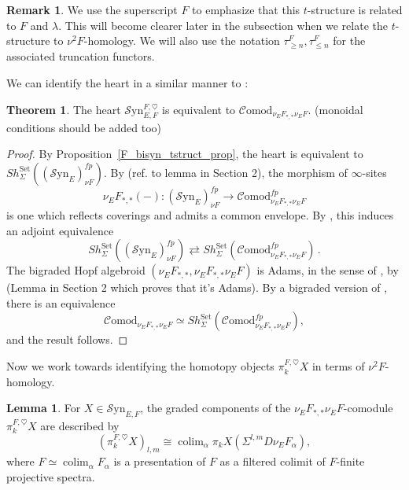 \documentclass[10pt]{amsart}
\theoremstyle{definition}
\numberwithin{figure}{section}
\numberwithin{equation}{section}
\newtheorem{theorem}[figure]{Theorem}
\newtheorem{lemma}[figure]{Lemma}
\newtheorem{remark}[figure]{Remark}
\theoremstyle{cited}
\newcommand{\colim}{\operatorname{colim}}
\newcommand{\Syn}{\mathcal{S}\mathrm{yn}}
\newcommand{\Comod}{\mathcal{C}\mathrm{omod}}
\begin{document}
\begin{remark}
We use the superscript $F$ to emphasize that this $t$-structure is related to $F$ and $\lambda$. This will become clearer later in the subsection when we relate the $t$-structure to $\nu^2F$-homology. We will also use the notation $\tau_{\geq n}^F, \tau_{\leq n}^F$ for the associated truncation functors.
\end{remark}

We can identify the heart in a similar manner to \cite{Pst22}:

\begin{theorem}
    The heart $\Syn_{E,F}^{F,\heartsuit}$ is equivalent to $\Comod_{\nu_EF_{*,*}\nu_EF}$. (monoidal conditions should be added too)
\end{theorem}

\begin{proof}
    By Proposition~\ref{F_bisyn_tstruct_prop}, the heart is equivalent to $Sh_{\Sigma}^{\mathrm{Set}}((\Syn_E)_{\nu F}^{fp})$. By (ref. to lemma in Section 2), the morphism of $\infty$-sites $$\nu_EF_{*,*}(-):(\Syn_E)_{\nu F}^{fp}\to\Comod_{\nu_EF_{*,*}\nu_EF}^{fp}$$ is one which reflects coverings and admits a common envelope. By \cite[Rem. 2.50]{Pst22}, this induces an adjoint equivalence $$Sh_{\Sigma}^{\mathrm{Set}}((\Syn_E)_{\nu F}^{fp})\rightleftarrows Sh_{\Sigma}^{\mathrm{Set}}(\Comod_{\nu_EF_{*,*}\nu_EF}^{fp})\,.$$
The bigraded Hopf algebroid $(\nu_EF_{*,*},\nu_EF_{*,*}\nu_EF)$ is Adams, in the sense of \cite[Def. 3.1]{Pst22}, by (Lemma in Section 2 which proves that it's Adams). By a bigraded version of \cite[2.1.12]{GH05}, \cite[Thm. 3.2]{Pst22} there is an equivalence
$$
\Comod_{\nu_EF_{*,*}\nu_EF}\simeq Sh_{\Sigma}^{\mathrm{Set}}(\Comod_{\nu_EF_{*,*}\nu_EF}^{fp}),
$$
and the result follows.
\end{proof}

Now we work towards identifying the homotopy objects $\pi_k^{F,\heartsuit}X$ in terms of $\nu^2F$-homology.

\begin{lemma}
\label{F_dual_tstruct_lemma}
    For $X\in\Syn_{E,F}$, the graded components of the $\nu_EF_{*,*}\nu_EF$-comodule $\pi_k^{F,\heartsuit}X$ are described by
    $$
(\pi_k^{F,\heartsuit}X)_{l,m} \cong \colim_\alpha \pi_kX(\Sigma^{l,m}D\nu_E F_\alpha),
    $$
    where $F\simeq \colim_\alpha F_\alpha$ is a presentation of $F$ as a filtered colimit of $F$-finite projective spectra.
\end{lemma}
\end{document}
